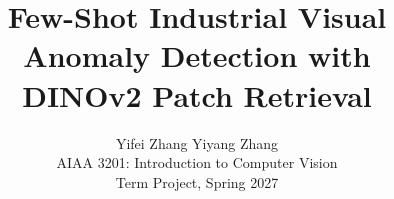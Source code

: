\documentclass[10pt,twocolumn,letterpaper]{article}
\title{Few-Shot Industrial Visual Anomaly Detection with\\DINOv2 Patch Retrieval}
\author{
Yifei Zhang \quad Yiyang Zhang\\[1ex]
AIAA 3201: Introduction to Computer Vision\\
Term Project, Spring 2027
}
\begin{document}
\maketitle








{
    \small
    
    
}
\end{document}
